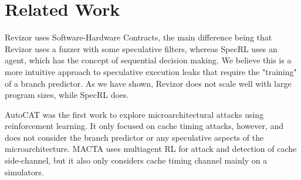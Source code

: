 \section{Related Work}
Revizor \cite{oleksenko2022revizor} uses Software-Hardware Contracts, the main difference being that Revizor uses a fuzzer with some speculative filters, whereas SpecRL uses an agent, which has the concept of sequential decision making. We believe this is a more intuitive approach to speculative execution leaks that require the "training" of a branch predictor. As we have shown, Revizor does not scale well with large program sizes, while SpecRL does.


AutoCAT \cite{luo2023autocat} was the first work to explore microarchitectural attacks using reinforcement learning. It only focused on cache timing attacks, however, and does not consider the branch predictor or any speculative aspects of the microarchitecture. MACTA \cite{cui2023macta} uses multiagent RL for attack and detection of cache side-channel, but it also only considers cache timing channel mainly on a simulators.